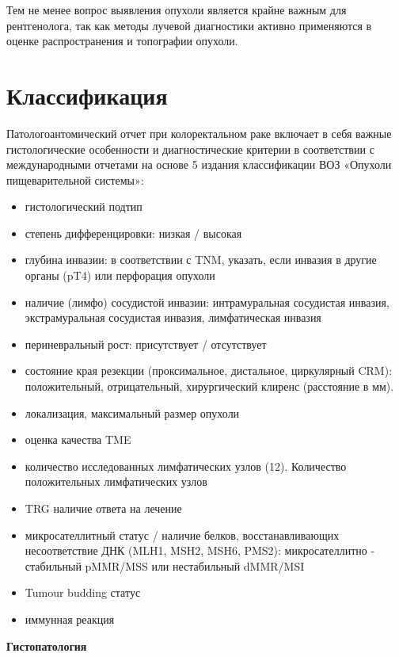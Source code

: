 \documentclass[
  russian,
  12pt,
  a4paper,
]{report}
\providecommand{\tightlist}{%
  \setlength{\itemsep}{0pt}\setlength{\parskip}{0pt}}
\begin{document}
Тем не менее вопрос выявления опухоли является крайне важным для
рентгенолога, так как методы лучевой диагностики активно применяются в
оценке распространения и топографии опухоли.

\chapter{\texorpdfstring{\textbf{Классификация}}{Классификация}}\label{ux43aux43bux430ux441ux441ux438ux444ux438ux43aux430ux446ux438ux44f}

Патологоантомический отчет при колоректальном раке включает в себя
важные гистологические особенности и диагностические критерии в
соответствии с международными отчетами на основе 5 издания классификации
ВОЗ «Опухоли пищеварительной системы»:

\begin{itemize}
\tightlist
\item
  гистологический подтип
\item
  степень дифференцировки: низкая / высокая
\item
  глубина инвазии: в соответствии с TNM, указать, если инвазия в другие
  органы (pT4) или перфорация опухоли
\item
  наличие (лимфо) сосудистой инвазии: интрамуральная сосудистая инвазия,
  экстрамуральная сосудистая инвазия, лимфатическая инвазия
\item
  периневральный рост: присутствует / отсутствует
\item
  состояние края резекции (проксимальное, дистальное, циркулярный CRM):
  положительный, отрицательный, хирургический клиренс (расстояние в мм).
\item
  локализация, максимальный размер опухоли
\item
  оценка качества TME
\item
  количество исследованных лимфатических узлов (12). Количество
  положительных лимфатических узлов
\item
  TRG наличие ответа на лечение
\item
  микросателлитный статус / наличие белков, восстанавливающих
  несоответствие ДНК (MLH1, MSH2, MSH6, PMS2): микросателлитно -
  стабильный pMMR/MSS или нестабильный dMMR/MSI
\item
  Tumour budding статус
\item
  иммунная реакция
\end{itemize}

\textbf{Гистопатология}
\end{document}
